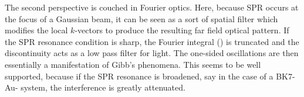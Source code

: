 The second perspective is couched in Fourier optics.  Here, because
SPR occurs at the focus of a Gaussian beam, it can be seen as a sort of
spatial filter which modifies the local $k$-vectors to produce
the resulting far field optical pattern.  If the SPR resonance condition is
sharp, the Fourier integral () is truncated and
the discontinuity acts as a low pass filter for light.  The one-sided
oscillations are then essentially a manifestation of Gibb's phenomena.
This seems to be well supported, because if the SPR resonance is broadened,
say in the case of a BK7-Au- system, the interference is greatly
attenuated.


